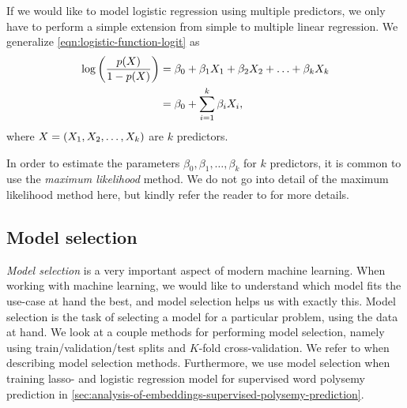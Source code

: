 If we would like to model logistic regression using multiple predictors, we only have to perform a simple extension from simple to multiple linear regression. We generalize \cref{eqn:logistic-function-logit} as
\begin{align}
    \log \left(\frac{p(X)}{1 - p(X)}\right)
    &= \beta_0 + \beta_1 X_1 + \beta_2 X_2 + \ldots + \beta_k X_k \\
    &= \beta_0 + \sum\limits_{i=1}^{k}{\beta_i X_i},
    \label{eqn:logistic-function-logit-multiple}
\end{align}
where $X = \left(X_1, X_2, \ldots, X_k\right)$ are $k$ predictors.

In order to estimate the parameters $\beta_0, \beta_1, \ldots, \beta_k$ for $k$ predictors, it is common to use the \textit{maximum likelihood} method. We do not go into detail of the maximum likelihood method here, but kindly refer the reader to \cite[p. 214]{fox2015applied} for more details.

\subsection{Model selection}
\label{sec:model-selection}
\textit{Model selection} is a very important aspect of modern machine learning. When working with machine learning, we  would like to understand which model fits the use-case at hand the best, and model selection helps us with exactly this. Model selection is the task of selecting a model for a particular problem, using the data at hand. We look at a couple methods for performing model selection, namely using train/validation/test splits and $K$-fold cross-validation. We refer to \cite{James2013} when describing model selection methods. Furthermore, we use model selection when training lasso- and logistic regression model for supervised word polysemy prediction in \cref{sec:analysis-of-embeddings-supervised-polysemy-prediction}.

